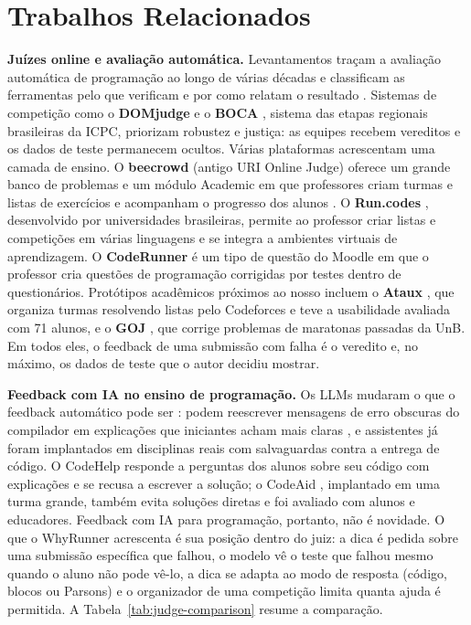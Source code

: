 \documentclass[12pt]{article}
\begin{document}
\section{Trabalhos Relacionados}\label{sec:related}

\textbf{Juízes online e avaliação automática.} Levantamentos traçam a avaliação automática de programação ao longo de várias décadas e classificam as ferramentas pelo que verificam e por como relatam o resultado \cite{alamutka2005survey,ihantola2010review,wasik2018survey}. Sistemas de competição como o \textbf{DOMjudge} \cite{domjudge2024} e o \textbf{BOCA} \cite{de2004boca}, sistema das etapas regionais brasileiras da ICPC, priorizam robustez e justiça: as equipes recebem vereditos e os dados de teste permanecem ocultos. Várias plataformas acrescentam uma camada de ensino. O \textbf{beecrowd} (antigo URI Online Judge) oferece um grande banco de problemas e um módulo Academic em que professores criam turmas e listas de exercícios e acompanham o progresso dos alunos \cite{bez2014uri}. O \textbf{Run.codes} \cite{runcodes2024}, desenvolvido por universidades brasileiras, permite ao professor criar listas e competições em várias linguagens e se integra a ambientes virtuais de aprendizagem. O \textbf{CodeRunner} \cite{lobb2016coderunner} é um tipo de questão do Moodle em que o professor cria questões de programação corrigidas por testes dentro de questionários. Protótipos acadêmicos próximos ao nosso incluem o \textbf{Ataux} \cite{silva2021ataux}, que organiza turmas resolvendo listas pelo Codeforces e teve a usabilidade avaliada com 71 alunos, e o \textbf{GOJ} \cite{lima2022gamma}, que corrige problemas de maratonas passadas da UnB. Em todos eles, o feedback de uma submissão com falha é o veredito e, no máximo, os dados de teste que o autor decidiu mostrar.

\textbf{Feedback com IA no ensino de programação.} Os LLMs mudaram o que o feedback automático pode ser \cite{denny2024computing}: podem reescrever mensagens de erro obscuras do compilador em explicações que iniciantes acham mais claras \cite{leinonen2023error}, e assistentes já foram implantados em disciplinas reais com salvaguardas contra a entrega de código. O CodeHelp \cite{liffiton2023codehelp} responde a perguntas dos alunos sobre seu código com explicações e se recusa a escrever a solução; o CodeAid \cite{kazemitabaar2024codeaid}, implantado em uma turma grande, também evita soluções diretas e foi avaliado com alunos e educadores. Feedback com IA para programação, portanto, não é novidade. O que o WhyRunner acrescenta é sua posição dentro do juiz: a dica é pedida sobre uma submissão específica que falhou, o modelo vê o teste que falhou mesmo quando o aluno não pode vê-lo, a dica se adapta ao modo de resposta (código, blocos ou Parsons) e o organizador de uma competição limita quanta ajuda é permitida. A Tabela~\ref{tab:judge-comparison} resume a comparação.
\end{document}
